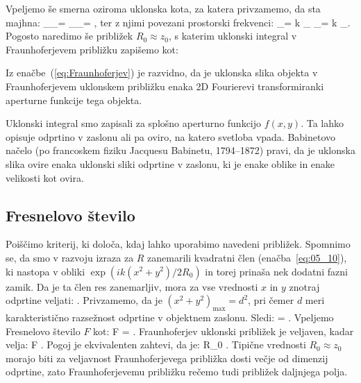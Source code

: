 Vpeljemo še smerna oziroma uklonska kota, za katera privzamemo, da sta majhna:
\beq
\sin \vartheta_\xi \approx \vartheta_\xi = 
\qquad {}
\qquad
\sin \vartheta_\eta \approx \vartheta_\eta = ,
\label{eq:05_13}
\eeq
ter z njimi povezani prostorski frekvenci:
\beq
\omega_\xi = k \vartheta_\xi
\qquad {}
\qquad
\omega_\eta = k \vartheta_\eta.
\label{eq:05_14}
\eeq
Pogosto naredimo še približek $R_0 \approx z_0$, s katerim uklonski integral 
v Fraunhoferjevem približku zapišemo kot:

Iz enačbe~(\ref{eq:Fraunhoferjev}) je razvidno, 
da je uklonska slika objekta v Fraunhoferjevem uklonskem približku
enaka 2D Fourierevi transformiranki aperturne funkcije tega objekta. 

\begin{remark}
Uklonski integral smo zapisali za splošno aperturno funkcijo $f(x,y)$. Ta lahko
opisuje odprtino v zaslonu ali pa oviro, na katero svetloba vpada. 
Babinetovo načelo (po francoskem fiziku Jacquesu Babinetu, 1794--1872) pravi, 
da je uklonska slika ovire enaka uklonski sliki odprtine v zaslonu, 
ki je enake oblike in enake velikosti kot ovira. 
\end{remark}

\subsection*{Fresnelovo število}
Poiščimo kriterij, ki določa, kdaj lahko uporabimo navedeni približek. Spomnimo se, da smo
v razvoju izraza za $R$ zanemarili kvadratni člen (enačba~\ref{eq:05_10}), ki 
nastopa v obliki $\exp(ik(x^2 + y^2)/2R_0)$ in torej prinaša nek dodatni fazni zamik. 
Da je ta člen res zanemarljiv, mora za vse vrednosti $x$ in $y$ znotraj odprtine veljati:
\beq
{}  \pi.
\label{eq:05_15}
\eeq
Privzamemo, da je $(x^2+y^2)_\mathrm{max} = d^2$, pri čemer $d$ meri karakteristično razsežnost 
odprtine v objektnem zaslonu. Sledi:
\beq
{}  = \frac{2\pi}{\lambda} \pi.
\label{eq:05_16}
\eeq
Vpeljemo Fresnelovo število $F$ kot:
\beq
F  = .
\label{eq:05_17}
\eeq
Fraunhoferjev uklonski približek je veljaven, kadar velja:
\beq
F . 
\label{eq:05_18}
\eeq
Pogoj je ekvivalenten zahtevi, da je: 
\beq
R_0 \gg {}.
\label{eq:05_19}
\eeq
Tipične vrednosti $R_0 \approx z_0$  morajo biti za veljavnost Fraunhoferjevega 
približka dosti večje od dimenzij odprtine, zato 
Fraunhoferjevemu približku rečemo tudi približek daljnjega polja. 

